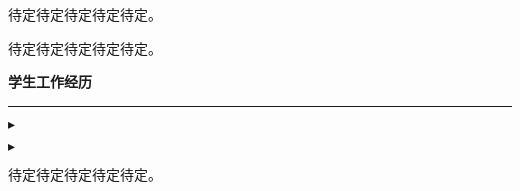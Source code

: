 \documentclass{resume}
\begin{document}

\hspace*{2em}待定待定待定待定待定。


\hspace*{2em}待定待定待定待定待定。

\bigskip

{\bf\kaiti\large 学生工作经历}

\smallskip
\hrule
\medskip

$\blacktriangleright$

\begin{minipage}{0.48 \textwidth} 
    
\end{minipage}
\hspace{0.03 \textwidth}
\begin{minipage}{0.48 \textwidth}
\end{minipage}

$\blacktriangleright$

待定待定待定待定待定。
\end{document}
